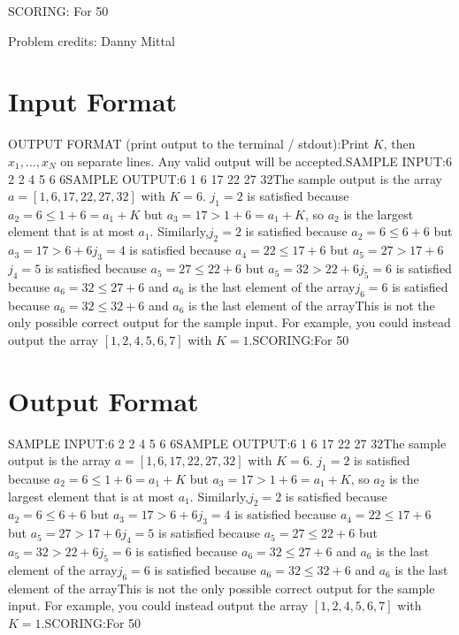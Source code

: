 \documentclass[12pt]{article}
\begin{document}
SCORING:
For 50%


Problem credits: Danny Mittal



\section*{Input Format}
OUTPUT FORMAT (print output to the terminal / stdout):Print $K$, then $x_1,\ldots,x_N$ on separate lines. Any valid output will be
accepted.SAMPLE INPUT:6
2 2 4 5 6 6SAMPLE OUTPUT:6
1
6
17
22
27
32The sample output is the array $a = [1, 6, 17, 22, 27, 32]$ with $K = 6$.
$j_1 = 2$ is satisfied because $a_2 = 6 \leq 1 + 6 = a_1 + K$ but
$a_3 = 17 > 1 + 6 = a_1 + K$, so $a_2$ is the largest element that is at most
$a_1$. Similarly,$j_2 = 2$ is satisfied because $a_2 = 6 \leq 6 + 6$ but
$a_3 = 17 > 6 + 6$$j_3 = 4$ is satisfied because
$a_4 = 22 \leq 17 + 6$ but $a_5 = 27 > 17 + 6$$j_4 = 5$ is satisfied
because $a_5 = 27 \leq 22 + 6$ but $a_5 = 32 > 22 + 6$$j_5 = 6$ is
satisfied because $a_6 = 32 \leq 27 + 6$ and $a_6$ is the last element of the
array$j_6 = 6$ is satisfied because $a_6 = 32 \leq 32 + 6$ and $a_6$
is the last element of the arrayThis is not the only possible correct output for the sample input. For example,
you could instead output the array $[1, 2, 4, 5, 6, 7]$ with $K = 1$.SCORING:For 50%

\section*{Output Format}
SAMPLE INPUT:6
2 2 4 5 6 6SAMPLE OUTPUT:6
1
6
17
22
27
32The sample output is the array $a = [1, 6, 17, 22, 27, 32]$ with $K = 6$.
$j_1 = 2$ is satisfied because $a_2 = 6 \leq 1 + 6 = a_1 + K$ but
$a_3 = 17 > 1 + 6 = a_1 + K$, so $a_2$ is the largest element that is at most
$a_1$. Similarly,$j_2 = 2$ is satisfied because $a_2 = 6 \leq 6 + 6$ but
$a_3 = 17 > 6 + 6$$j_3 = 4$ is satisfied because
$a_4 = 22 \leq 17 + 6$ but $a_5 = 27 > 17 + 6$$j_4 = 5$ is satisfied
because $a_5 = 27 \leq 22 + 6$ but $a_5 = 32 > 22 + 6$$j_5 = 6$ is
satisfied because $a_6 = 32 \leq 27 + 6$ and $a_6$ is the last element of the
array$j_6 = 6$ is satisfied because $a_6 = 32 \leq 32 + 6$ and $a_6$
is the last element of the arrayThis is not the only possible correct output for the sample input. For example,
you could instead output the array $[1, 2, 4, 5, 6, 7]$ with $K = 1$.SCORING:For 50%
\end{document}
